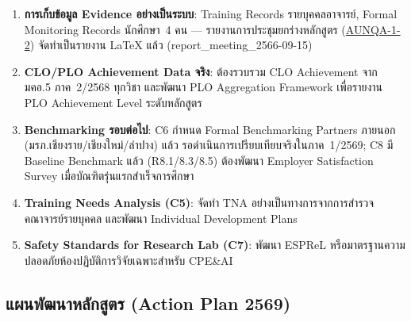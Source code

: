 \begin{enumerate}
  \item \textbf{การเก็บข้อมูล Evidence อย่างเป็นระบบ}: Training Records รายบุคคลอาจารย์, Formal Monitoring Records นักศึกษา~4 คน --- รายงานการประชุมยกร่างหลักสูตร (\hyperlink{ref:AUNQA-1-2}{AUNQA-1-2}) จัดทำเป็นรายงาน LaTeX แล้ว (report\_meeting\_2566-09-15)

  \item \textbf{CLO/PLO Achievement Data จริง}: ต้องรวบรวม CLO Achievement จาก มคอ.5 ภาค~2/2568 ทุกวิชา และพัฒนา PLO Aggregation Framework เพื่อรายงาน PLO Achievement Level ระดับหลักสูตร

  \item \textbf{Benchmarking รอบต่อไป}: C6 กำหนด Formal Benchmarking Partners ภายนอก (มรภ.เชียงราย/เชียงใหม่/ลำปาง) แล้ว รอดำเนินการเปรียบเทียบจริงในภาค~1/2569; C8 มี Baseline Benchmark แล้ว (R8.1/8.3/8.5) ต้องพัฒนา Employer Satisfaction Survey เมื่อบัณฑิตรุ่นแรกสำเร็จการศึกษา

  \item \textbf{Training Needs Analysis (C5)}: จัดทำ TNA อย่างเป็นทางการจากการสำรวจคณาจารย์รายบุคคล และพัฒนา Individual Development Plans

  \item \textbf{Safety Standards for Research Lab (C7)}: พัฒนา ESPReL หรือมาตรฐานความปลอดภัยห้องปฏิบัติการวิจัยเฉพาะสำหรับ CPE\&AI

\end{enumerate}

\subsection*{แผนพัฒนาหลักสูตร (Action Plan 2569)}

